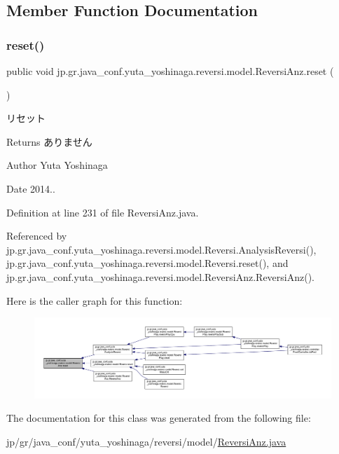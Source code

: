 \subsection{Member Function Documentation}
\mbox{\label{classjp_1_1gr_1_1java__conf_1_1yuta__yoshinaga_1_1reversi_1_1model_1_1_reversi_anz_ab87a68776fedd66e0fa8bed2c24d461b}} 
\subsubsection{\texorpdfstring{reset()}{reset()}}
{\footnotesize\ttfamily public void jp.\+gr.\+java\+\_\+conf.\+yuta\+\_\+yoshinaga.\+reversi.\+model.\+Reversi\+Anz.\+reset (\begin{DoxyParamCaption}{ }\end{DoxyParamCaption})}



リセット 

\begin{DoxyReturn}{Returns}
ありません 
\end{DoxyReturn}
\begin{DoxyAuthor}{Author}
Yuta Yoshinaga 
\end{DoxyAuthor}
\begin{DoxyDate}{Date}
2014.. 
\end{DoxyDate}


Definition at line 231 of file Reversi\+Anz.\+java.



Referenced by jp.\+gr.\+java\+\_\+conf.\+yuta\+\_\+yoshinaga.\+reversi.\+model.\+Reversi.\+Analysis\+Reversi(), jp.\+gr.\+java\+\_\+conf.\+yuta\+\_\+yoshinaga.\+reversi.\+model.\+Reversi.\+reset(), and jp.\+gr.\+java\+\_\+conf.\+yuta\+\_\+yoshinaga.\+reversi.\+model.\+Reversi\+Anz.\+Reversi\+Anz().

Here is the caller graph for this function\+:\nopagebreak
\begin{figure}[H]
\begin{center}
\leavevmode
\includegraphics[width=350pt]{classjp_1_1gr_1_1java__conf_1_1yuta__yoshinaga_1_1reversi_1_1model_1_1_reversi_anz_ab87a68776fedd66e0fa8bed2c24d461b_icgraph}
\end{center}
\end{figure}


The documentation for this class was generated from the following file\+:\begin{DoxyCompactItemize}
\item 
jp/gr/java\+\_\+conf/yuta\+\_\+yoshinaga/reversi/model/\mbox{\hyperlink{_reversi_anz_8java}{Reversi\+Anz.\+java}}\end{DoxyCompactItemize}
